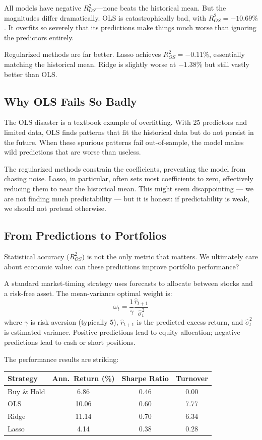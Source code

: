 \documentclass[11pt,a4paper]{article}
\begin{document}
All models have negative $R^2_{OS}$---none beats the historical mean. But the magnitudes differ dramatically. OLS is catastrophically bad, with $R^2_{OS} = -10.69\%$. It overfits so severely that its predictions make things much worse than ignoring the predictors entirely.

Regularized methods are far better. Lasso achieves $R^2_{OS} = -0.11\%$, essentially matching the historical mean. Ridge is slightly worse at $-1.38\%$ but still vastly better than OLS.

\subsection{Why OLS Fails So Badly}

The OLS disaster is a textbook example of overfitting. With 25 predictors and limited data, OLS finds patterns that fit the historical data but do not persist in the future. When these spurious patterns fail out-of-sample, the model makes wild predictions that are worse than useless.

The regularized methods constrain the coefficients, preventing the model from chasing noise. Lasso, in particular, often sets most coefficients to zero, effectively reducing them to near the historical mean. This might seem disappointing — we are not finding much predictability — but it is honest: if predictability is weak, we should not pretend otherwise.

\subsection{From Predictions to Portfolios}

Statistical accuracy ($R^2_{OS}$) is not the only metric that matters. We ultimately care about economic value: can these predictions improve portfolio performance?

A standard market-timing strategy uses forecasts to allocate between stocks and a risk-free asset. The mean-variance optimal weight is:
\[
\omega_t = \frac{1}{\gamma} \frac{\widehat{r}_{t+1}}{\widehat{\sigma}^2_t}
\]
where $\gamma$ is risk aversion (typically 5), $\widehat{r}_{t+1}$ is the predicted excess return, and $\widehat{\sigma}^2_t$ is estimated variance. Positive predictions lead to equity allocation; negative predictions lead to cash or short positions.

The performance results are striking:

\begin{center}
\begin{tabular}{lccc}
\toprule
\textbf{Strategy} & \textbf{Ann.\ Return (\%)} & \textbf{Sharpe Ratio} & \textbf{Turnover} \\
\midrule
Buy \& Hold & 6.86 & 0.46 & 0.00 \\
OLS & 10.06 & 0.60 & 7.77 \\
Ridge & 11.14 & 0.70 & 6.34 \\
Lasso & 4.14 & 0.38 & 0.28 \\
\bottomrule
\end{tabular}
\end{center}
\end{document}
